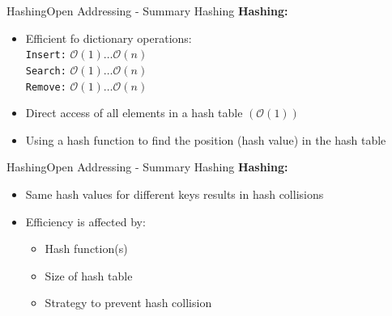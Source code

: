 
\begin{frame}{Hashing}{Open Addressing - Summary Hashing}
  \textbf{Hashing:}
  \begin{itemize}
    \item
      Efficient fo dictionary operations:\\
      \hspace{1.5em}\texttt{Insert:} $\mathcal{O}(1) \dots \mathcal{O}(n)$\\
      \hspace{1.5em}\texttt{Search:} $\mathcal{O}(1) \dots \mathcal{O}(n)$\\
      \hspace{1.5em}\texttt{Remove:} $\mathcal{O}(1) \dots \mathcal{O}(n)$
    \item
      Direct access of all elements in a hash table $(\mathcal{O}(1))$
    \item
      Using a hash function to find the position (hash value) in the hash table
  \end{itemize}
\end{frame}


\begin{frame}{Hashing}{Open Addressing - Summary Hashing}
  \textbf{Hashing:}
  \begin{itemize}
    \item
      Same hash values for different keys results in hash collisions
    \item
      Efficiency is affected by:
      \begin{itemize}
        \item
          Hash function(s)
        \item
          Size of hash table
        \item
          Strategy to prevent hash collision
      \end{itemize}
  \end{itemize}
\end{frame}